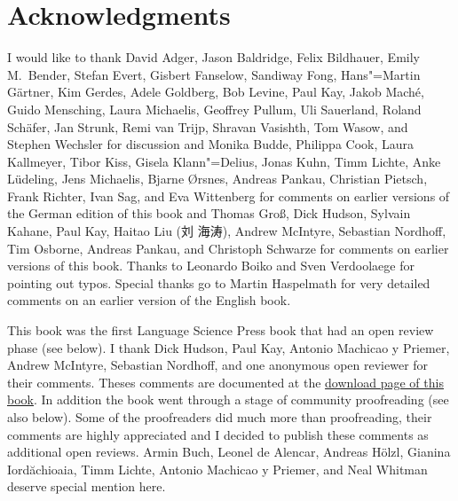 \section*{Acknowledgments}

\addlines
I would like to thank David Adger,
Jason Baldridge, 
Felix Bildhauer, 
Emily M.\ Bender,
Stefan Evert, 
Gisbert Fanselow, 
Sandiway Fong,
Hans"=Martin Gärtner,
Kim Gerdes,
Adele Goldberg,
Bob Levine,
Paul Kay,
Jakob Maché,
Guido Mensching,
Laura Michaelis,
Geoffrey Pullum, 
Uli Sauerland, 
Roland Schäfer,
Jan Strunk,
Remi van Trijp, 
Shravan Vasishth,
Tom Wasow, and
Stephen Wechsler
for discussion and 
%
Monika Budde, 
Philippa Cook,
Laura Kallmeyer, 
Tibor Kiss,
Gisela Klann"=Delius, 
Jonas Kuhn,
Timm Lichte, %
Anke Lüdeling,
Jens Michaelis,
Bjarne Ørsnes,
Andreas Pankau,     %
Christian Pietsch,
Frank Richter,
Ivan Sag, and
Eva Wittenberg
for comments on earlier versions of the German edition of this book and
%
%
Thomas Groß,
Dick Hudson,
Sylvain Kahane, 
Paul Kay,
Haitao Liu (刘 海涛),
Andrew McIntyre,
Sebastian Nordhoff,
Tim Osborne, 
Andreas Pankau, and
Christoph Schwarze
for comments on earlier versions of this book. Thanks to Leonardo Boiko and Sven Verdoolaege for pointing out typos.
Special thanks go to Martin Haspelmath for very detailed comments on an
earlier version of the English book. 

This book was the first Language Science Press book that had an open review phase (see below). I
thank Dick Hudson, Paul Kay, Antonio Machicao y Priemer, Andrew McIntyre, Sebastian Nordhoff, and one anonymous open
reviewer for their comments. Theses comments are documented at the \href{\lsURL}{download page of
  this book}. In addition the book went through a stage of community proofreading (see also
below). Some of the proofreaders did much more than proofreading, their comments are highly
appreciated and I decided to publish these comments as additional open reviews.
Armin Buch, 
Leonel de Alencar,
Andreas Hölzl,
Gianina Iordăchioaia,
Timm Lichte,
Antonio Machicao y Priemer, and
Neal Whitman
deserve special mention here.


